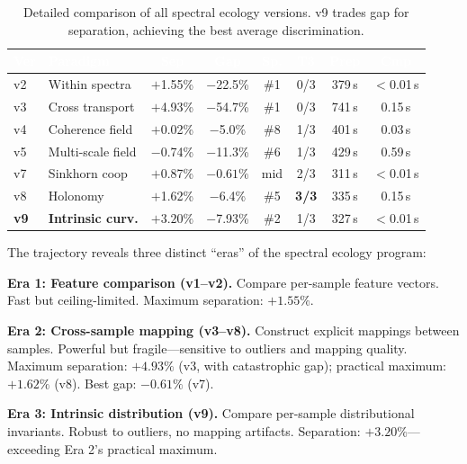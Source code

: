 \documentclass{../yalumba}
\begin{document}
\begin{table}[H]
  \centering
  \tablestyle
  \caption{Detailed comparison of all spectral ecology versions.  v9 trades
    gap for separation, achieving the best average discrimination.}
  \label{tab:version-comparison}
  \begin{tabular}{llcccccc}
    \toprule
    \rowcolor{table-header}
    \textcolor{white}{\textbf{Ver}} &
    \textcolor{white}{\textbf{Paradigm}} &
    \textcolor{white}{\textbf{Sep}} &
    \textcolor{white}{\textbf{Gap}} &
    \textcolor{white}{\textbf{Sp.}} &
    \textcolor{white}{\textbf{T3}} &
    \textcolor{white}{\textbf{Prep}} &
    \textcolor{white}{\textbf{Cmp}} \\
    \midrule
    v2 & Within spectra
      & $+$1.55\% & $-$22.5\% & \#1 & 0/3 & 379\,s & $<$0.01\,s \\
    v3 & Cross transport
      & $+$4.93\% & $-$54.7\% & \#1 & 0/3 & 741\,s & 0.15\,s \\
    v4 & Coherence field
      & $+$0.02\% & $-$5.0\% & \#8 & 1/3 & 401\,s & 0.03\,s \\
    v5 & Multi-scale field
      & $-$0.74\% & $-$11.3\% & \#6 & 1/3 & 429\,s & 0.59\,s \\
    v7 & Sinkhorn coop
      & $+$0.87\% & $\mathbf{-0.61\%}$ & mid & 2/3 & 311\,s & $<$0.01\,s \\
    v8 & Holonomy
      & $+$1.62\% & $-$6.4\% & \#5 & \textbf{3/3} & 335\,s & 0.15\,s \\
    \textbf{v9} & \textbf{Intrinsic curv.}
      & $\mathbf{+3.20\%}$ & $-$7.93\% & \#2 & 1/3 & 327\,s & $<$0.01\,s \\
    \bottomrule
  \end{tabular}
\end{table}

The trajectory reveals three distinct ``eras'' of the spectral ecology
program:

\textbf{Era 1: Feature comparison (v1--v2).}  Compare per-sample feature
vectors.  Fast but ceiling-limited.  Maximum separation: $+1.55\%$.

\textbf{Era 2: Cross-sample mapping (v3--v8).}  Construct explicit mappings
between samples.  Powerful but fragile---sensitive to outliers and mapping
quality.  Maximum separation: $+4.93\%$ (v3, with catastrophic gap);
practical maximum: $+1.62\%$ (v8).  Best gap: $-0.61\%$ (v7).

\textbf{Era 3: Intrinsic distribution (v9).}  Compare per-sample
distributional invariants.  Robust to outliers, no mapping artifacts.
Separation: $+3.20\%$---exceeding Era 2's practical maximum.
\end{document}
